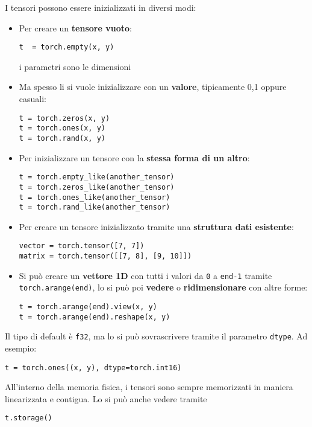 I tensori possono essere inizializzati in diversi modi: 
\begin{itemize}
    \item Per creare un \textbf{tensore vuoto}:
    \begin{verbatim}
t  = torch.empty(x, y)
    \end{verbatim}
    i parametri sono le dimensioni
    
    \item Ma spesso li si vuole inizializzare con un \textbf{valore}, tipicamente 0,1 oppure casuali:
    \begin{verbatim}
t = torch.zeros(x, y)
t = torch.ones(x, y)
t = torch.rand(x, y)
    \end{verbatim}
    
    \item Per inizializzare un tensore con la \textbf{stessa forma di un altro}:
    \begin{verbatim}
t = torch.empty_like(another_tensor)
t = torch.zeros_like(another_tensor)
t = torch.ones_like(another_tensor)
t = torch.rand_like(another_tensor)
    \end{verbatim}
    
    \item Per creare un tensore inizializzato tramite una \textbf{struttura dati esistente}:
    \begin{verbatim}
vector = torch.tensor([7, 7])
matrix = torch.tensor([[7, 8], [9, 10]])
    \end{verbatim}
    
    \item Si può creare un \textbf{vettore 1D} con tutti i valori da \texttt{0} a \texttt{end-1} tramite \texttt{torch.arange(end)}, lo si può poi \textbf{vedere} o \textbf{ridimensionare} con altre forme:
    \begin{verbatim}
t = torch.arange(end).view(x, y)
t = torch.arange(end).reshape(x, y)
    \end{verbatim}
\end{itemize}

Il tipo di default è \texttt{f32}, ma lo si può sovrascrivere tramite il parametro \texttt{dtype}. Ad esempio:
\begin{verbatim}
t = torch.ones((x, y), dtype=torch.int16)
\end{verbatim}

All'interno della memoria fisica, i tensori sono sempre memorizzati in maniera linearizzata e contigua. Lo si può anche vedere tramite
\begin{verbatim}
t.storage()
\end{verbatim}

